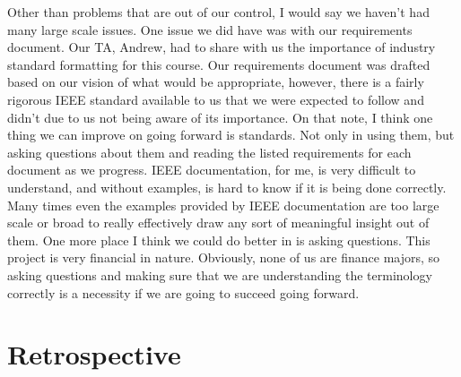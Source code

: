\documentclass[letterpaper,10pt,titlepage,journal,compsoc,draftclsnofoot,onecolumn]{IEEEtran}
\begin{document}
Other than problems that are out of our control, I would say we haven't had many large scale issues. One issue we did have was with our requirements document. Our TA, Andrew, had to share with us the importance of industry standard formatting for this course. Our requirements document was drafted based on our vision of what would be appropriate, however, there is a fairly rigorous IEEE standard available to us that we were expected to follow and didn't due to us not being aware of its importance. On that note, I think one thing we can improve on going forward is standards. Not only in using them, but asking questions about them and reading the listed requirements for each document as we progress. IEEE documentation, for me, is very difficult to understand, and without examples, is hard to know if it is being done correctly. Many times even the examples provided by IEEE documentation are too large scale or broad to really effectively draw any sort of meaningful insight out of them. One more place I think we could do better in is asking questions. This project is very financial in nature. Obviously, none of us are finance majors, so asking questions and making sure that we are understanding the terminology correctly is a necessity if we are going to succeed going forward.


\section{Retrospective}
\end{document}

